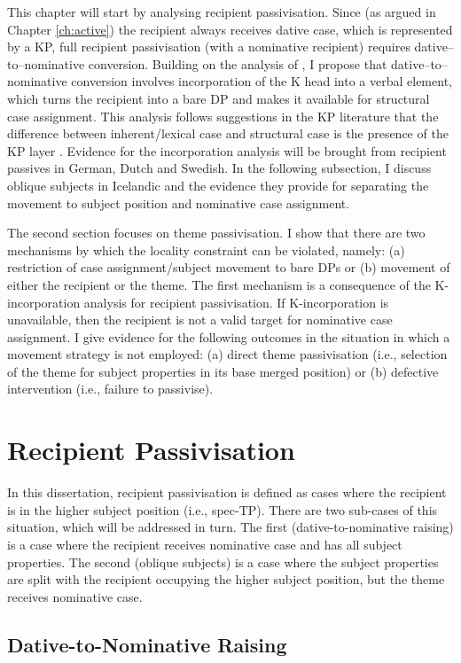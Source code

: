 This chapter will start by analysing recipient passivisation. Since (as argued in Chapter \ref{ch:active}) the recipient always receives dative case, which is represented by a KP, full recipient passivisation (with a nominative recipient) requires dative--to--nominative conversion. Building on the analysis of \cite{Alexiadou.2014}, I propose that dative--to--nominative conversion involves incorporation of the K head into a verbal element, which turns the recipient into a bare DP and makes it available for structural case assignment. This analysis follows suggestions in the KP literature that the difference between inherent/lexical case and structural case is the presence of the KP layer \citep{Bayer.2001}. Evidence for the incorporation analysis will be brought from recipient passives in German, Dutch and Swedish. In the following subsection, I discuss oblique subjects in Icelandic and the evidence they provide for separating the movement to subject position and nominative case assignment.

The second section focuses on theme passivisation. I show that there are two mechanisms by which the locality constraint can be violated, namely: (a) restriction of case assignment/subject movement to bare DPs or (b) movement of either the recipient or the theme. The first mechanism is a consequence of the K-incorporation analysis for recipient passivisation. If K-incorporation is unavailable, then the recipient is not a valid target for nominative case assignment. I give evidence for the following outcomes in the situation in which a movement strategy is not employed: (a) direct theme passivisation (i.e., selection of the theme for subject properties in its base merged position) or (b) defective intervention (i.e., failure to passivise).

\section{Recipient Passivisation}
In this dissertation, recipient passivisation is defined as cases where the recipient is in the higher subject position (i.e., spec-TP). There are two sub-cases of this situation, which will be addressed in turn. The first (dative-to-nominative raising) is a case where the recipient receives nominative case and has all subject properties. The second (oblique subjects) is a case where the subject properties are split with the recipient occupying the higher subject position, but the theme receives nominative case.

\subsection{Dative-to-Nominative Raising}

